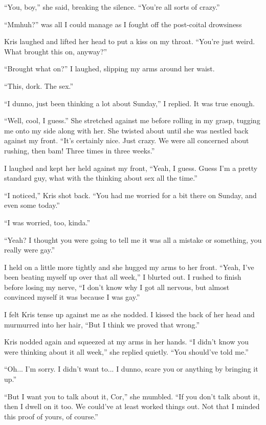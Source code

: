 ``You, boy,'' she said, breaking the silence.  ``You're all sorts of crazy.''

``Mmhuh?'' was all I could manage as I fought off the post-coital drowsiness

Kris laughed and lifted her head to put a kiss on my throat.  ``You're just weird.  What brought this on, anyway?''

``Brought what on?'' I laughed, slipping my arms around her waist.

``This, dork.  The sex.''

``I dunno, just been thinking a lot about Sunday,'' I replied.  It was true enough.

``Well, cool, I guess.''  She stretched against me before rolling in my grasp, tugging me onto my side along with her.  She twisted about until she was nestled back against my front.  ``It's certainly nice.  Just crazy.  We were all concerned about rushing, then bam!  Three times in three weeks.''

I laughed and kept her held against my front, ``Yeah, I guess.  Guess I'm a pretty standard guy, what with the thinking about sex all the time.''

``I noticed,'' Kris shot back.  ``You had me worried for a bit there on Sunday, and even some today.''

``I was worried, too, kinda.''

``Yeah?  I thought you were going to tell me it was all a mistake or something, you really were gay.''

I held on a little more tightly and she hugged my arms to her front.  ``Yeah, I've been beating myself up over that all week,'' I blurted out.  I rushed to finish before losing my nerve, ``I don't know why I got all nervous, but almost convinced myself it was because I was gay.''

I felt Kris tense up against me as she nodded.  I kissed the back of her head and murmurred into her hair, ``But I think we proved that wrong.''

Kris nodded again and squeezed at my arms in her hands.  ``I didn't know you were thinking about it all week,'' she replied quietly.  ``You should've told me.''

``Oh... I'm sorry.  I didn't want to... I dunno, scare you or anything by bringing it up.''

``But I want you to talk about it, Cor,'' she mumbled.  ``If you don't talk about it, then I dwell on it too.  We could've at least worked things out.  Not that I minded this proof of yours, of course.''

